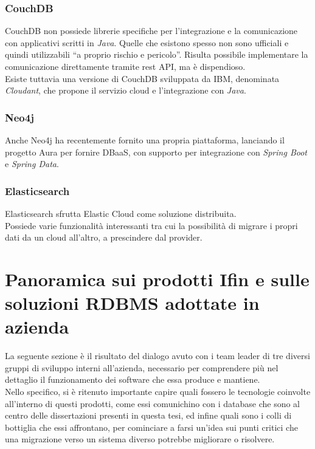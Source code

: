 \subsubsection{CouchDB}
CouchDB non possiede librerie specifiche per l'integrazione e la comunicazione con applicativi scritti in \textit{Java}. Quelle che esistono spesso non sono ufficiali e quindi utilizzabili ``a proprio rischio e pericolo''. Risulta possibile implementare la comunicazione direttamente tramite \gls{rest API}, ma è dispendioso.\\
Esiste tuttavia una versione di CouchDB sviluppata da IBM, denominata \textit{Cloudant}, che propone il servizio cloud e l'integrazione con \textit{Java}.

\subsubsection{Neo4j}
Anche Neo4j ha recentemente fornito una propria piattaforma, lanciando il progetto Aura per fornire \gls{DBaaS}, con supporto per integrazione con \textit{Spring Boot} e \textit{Spring Data}.

\subsubsection{Elasticsearch}
Elasticsearch sfrutta Elastic Cloud come soluzione distribuita.\\
Possiede varie funzionalità interessanti tra cui la possibilità di migrare i propri dati da un cloud all'altro, a prescindere dal provider.


\section{Panoramica sui prodotti Ifin e sulle soluzioni RDBMS adottate in azienda}

La seguente sezione è il risultato del dialogo avuto con i team leader di tre diversi gruppi di sviluppo interni all'azienda, necessario per comprendere più nel dettaglio il funzionamento dei software che essa produce e mantiene.\\
Nello specifico, si è ritenuto importante capire quali fossero le tecnologie coinvolte all'interno di questi prodotti, come essi comunichino con i database che sono al centro delle dissertazioni presenti in questa tesi, ed infine quali sono i colli di bottiglia che essi affrontano, per cominciare a farsi un'idea sui punti critici che una migrazione verso un sistema diverso potrebbe migliorare o risolvere.\\

